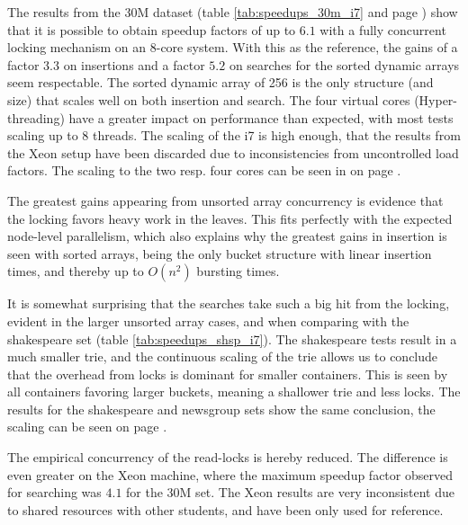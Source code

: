 The results from the 30M dataset (table \ref{tab:speedups_30m_i7} and page
\pageref{fig:ts_i7_30m}) show that it
is possible to obtain speedup factors of up to $6.1$ with a fully concurrent
locking mechanism on an 8-core system. With this as the reference, the gains of
a factor $3.3$ on insertions and a factor $5.2$ on searches for the sorted dynamic
arrays seem respectable. The sorted dynamic array of 256 is the only structure
(and size) that scales well on both insertion and search. The four virtual
cores (Hyper-threading) have a greater impact on performance than expected,
with most tests scaling up to 8 threads. The scaling of the i7 is high enough,
that the results from the Xeon setup have been discarded due to inconsistencies
from uncontrolled load factors. The scaling to the two resp. four cores can be
seen in on page \pageref{fig:ts_shsp}.

The greatest gains appearing from unsorted array concurrency is evidence that
the locking favors heavy work in the leaves. This fits perfectly with the
expected node-level parallelism, which also explains why the greatest gains in
insertion is seen with sorted arrays, being the only bucket structure with
linear insertion times, and thereby up to $O(n^2)$ bursting times.

It is somewhat surprising that the searches take such a big hit from the
locking, evident in the larger unsorted array cases, and when comparing with
the shakespeare set (table \ref{tab:speedups_shsp_i7}). The shakespeare tests
result in a much smaller trie, and the continuous scaling of the trie allows us
to conclude that the overhead from locks is dominant for smaller containers.
This is seen by all containers favoring larger buckets, meaning a shallower
trie and less locks. The results for the shakespeare and newsgroup sets show
the same conclusion, the scaling can be seen on page \pageref{fig:ts_i7_nsgrp}.

The empirical concurrency of the read-locks is hereby reduced. The difference
is even greater on the Xeon machine, where the maximum speedup factor observed
for searching was $4.1$ for the 30M set. The Xeon results are very inconsistent
    due to shared resources with other students, and have been only used for
    reference.


